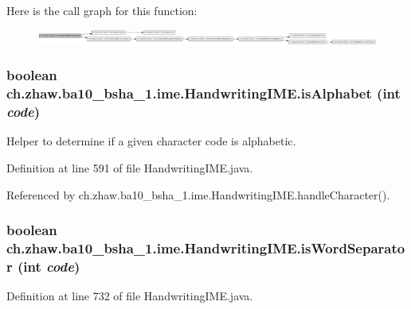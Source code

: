 Here is the call graph for this function:\nopagebreak
\begin{figure}[H]
\begin{center}
\leavevmode
\includegraphics[width=420pt]{classch_1_1zhaw_1_1ba10__bsha__1_1_1ime_1_1HandwritingIME_a4287014b4f552f286e8b51ef841573b1_cgraph}
\end{center}
\end{figure}
\hypertarget{classch_1_1zhaw_1_1ba10__bsha__1_1_1ime_1_1HandwritingIME_a0cc6d7c254ce701f73f5852bafe294b4}{
\subsubsection[{isAlphabet}]{\setlength{\rightskip}{0pt plus 5cm}boolean ch.zhaw.ba10\_\-bsha\_\-1.ime.HandwritingIME.isAlphabet (int {\em code})}}
\label{classch_1_1zhaw_1_1ba10__bsha__1_1_1ime_1_1HandwritingIME_a0cc6d7c254ce701f73f5852bafe294b4}
Helper to determine if a given character code is alphabetic. 

Definition at line 591 of file HandwritingIME.java.

Referenced by ch.zhaw.ba10\_\-bsha\_\-1.ime.HandwritingIME.handleCharacter().\hypertarget{classch_1_1zhaw_1_1ba10__bsha__1_1_1ime_1_1HandwritingIME_aeef9b5d4fa9f314d5bf17331645ba93b}{
\subsubsection[{isWordSeparator}]{\setlength{\rightskip}{0pt plus 5cm}boolean ch.zhaw.ba10\_\-bsha\_\-1.ime.HandwritingIME.isWordSeparator (int {\em code})}}
\label{classch_1_1zhaw_1_1ba10__bsha__1_1_1ime_1_1HandwritingIME_aeef9b5d4fa9f314d5bf17331645ba93b}


Definition at line 732 of file HandwritingIME.java.

